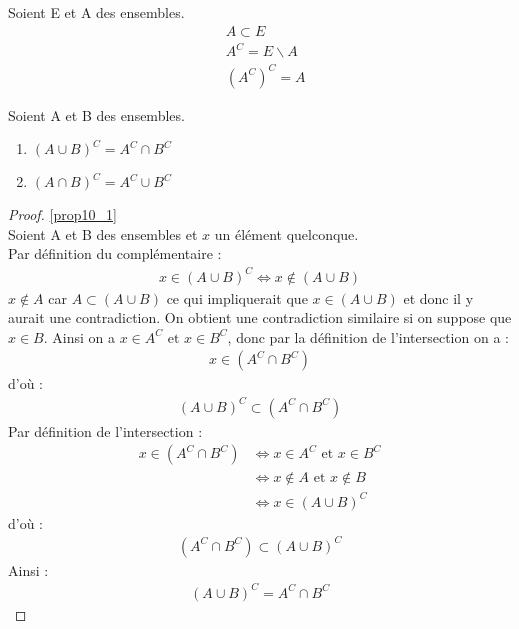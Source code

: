 \begin{remarque}Soient E et A des ensembles.
	\begin{align*}
		&A \subset E \\
		&A^C = E \backslash A \\
		&(A^C)^C = A
	\end{align*}
\end{remarque}



    \begin{proposition} Soient A et B des ensembles.
	\begin{enumerate}
        \item \label{prop10_1} $(A \cup B)^C = A^C \cap B^C$
        \item \label{prop10_2} $(A \cap B)^C = A^C \cup B^C$
	\end{enumerate}
\end{proposition}

\begin{proof}
	\ref{prop10_1} \\
	Soient A et B des ensembles et $x$ un élément quelconque.
	\\
	\framebox{$\subset$}
	Par définition du complémentaire : 
	\begin{align*}
		x \in (A \cup B)^C \iff x \notin (A \cup B)
	\end{align*}
	$x \notin A$ car $A \subset (A \cup B)$ ce qui impliquerait que $x \in (A \cup B)$ et donc il y aurait une contradiction. On obtient une contradiction similaire si on suppose que $x \in B$. Ainsi on a $x \in A^C \text{ et } x \in B^C$, donc par la définition de l'intersection on a :
	\begin{align*}
		x \in (A^C \cap B^C)
	\end{align*}
	d'où :
	\begin{align*}
		(A \cup B)^C \subset (A^C \cap B^C)
	\end{align*}
	\framebox{$\supset$} Par définition de l'intersection :
	\begin{align*}
		x \in (A^C \cap B^C) &\iff x \in A^C \text{ et } x \in B^C \\
		&\iff x \notin A \text{ et } x \notin B \\
		&\iff x \in (A \cup B)^C
	\end{align*}
	d'où :
	\begin{align*}
		(A^C \cap B^C) \subset (A \cup B)^C
	\end{align*}
	Ainsi : 
	\begin{align*}
		(A \cup B)^C = A^C \cap B^C
	\end{align*}
\end{proof}

